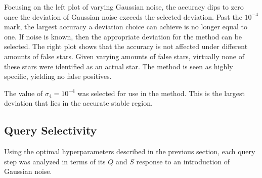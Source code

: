 Focusing on the left plot of varying Gaussian noise, the accuracy dips to zero once the deviation of Gaussian noise
exceeds the selected deviation.
Past the $10^{-4}$ mark, the largest accuracy a deviation choice can achieve is no longer equal to one.
If noise is known, then the appropriate deviation for the  method can be selected.
The right plot shows that the accuracy is not affected under different amounts of false stars.
Given varying amounts of false stars, virtually none of these stars were identified as an actual star.
The  method is seen as highly specific, yielding no false positives.

The value of $\sigma_4 = 10^{-4}$ was selected for use in the  method.
This is the largest deviation that lies in the accurate stable region.

\subsection{Query Selectivity}\label{subsec:querySelectivityResults}
Using the optimal hyperparameters described in the previous section, each query step was analyzed in terms of its
$Q$ and $S$ response to an introduction of Gaussian noise.

\begin{table}
\end{table}

